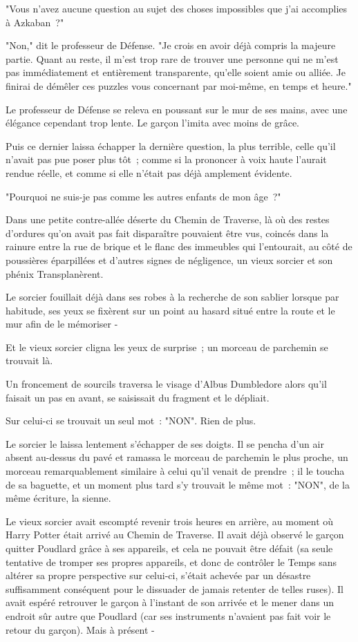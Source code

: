 "Vous n'avez aucune question au sujet des choses impossibles que j'ai accomplies à Azkaban~?"

"Non," dit le professeur de Défense. "Je crois en avoir déjà compris la majeure partie. Quant au reste, il m'est trop rare de trouver une personne qui ne m'est pas immédiatement et entièrement transparente, qu'elle soient amie ou alliée. Je finirai de démêler ces puzzles vous concernant par moi-même, en temps et heure."

Le professeur de Défense se releva en poussant sur le mur de ses mains, avec une élégance cependant trop lente. Le garçon l'imita avec moins de grâce.

Puis ce dernier laissa échapper la dernière question, la plus terrible, celle qu'il n'avait pas pue poser plus tôt~; comme si la prononcer à voix haute l'aurait rendue réelle, et comme si elle n'était pas déjà amplement évidente.

"Pourquoi ne suis-je pas comme les autres enfants de mon âge~?"

\later

Dans une petite contre-allée déserte du Chemin de Traverse, là où des restes d'ordures qu'on avait pas fait disparaître pouvaient être vus, coincés dans la rainure entre la rue de brique et le flanc des immeubles qui l'entourait, au côté de poussières éparpillées et d'autres signes de négligence, un vieux sorcier et son phénix Transplanèrent.

Le sorcier fouillait déjà dans ses robes à la recherche de son sablier lorsque par habitude, ses yeux se fixèrent sur un point au hasard situé entre la route et le mur afin de le mémoriser -

Et le vieux sorcier cligna les yeux de surprise~; un morceau de parchemin se trouvait là.

Un froncement de sourcils traversa le visage d'Albus Dumbledore alors qu'il faisait un pas en avant, se saisissait du fragment et le dépliait.

Sur celui-ci se trouvait un seul mot~: "NON". Rien de plus.

Le sorcier le laissa lentement s'échapper de ses doigts. Il se pencha d'un air absent au-dessus du pavé et ramassa le morceau de parchemin le plus proche, un morceau remarquablement similaire à celui qu'il venait de prendre~; il le toucha de sa baguette, et un moment plus tard s'y trouvait le même mot~: "NON", de la même écriture, la sienne.

Le vieux sorcier avait escompté revenir trois heures en arrière, au moment où Harry Potter était arrivé au Chemin de Traverse. Il avait déjà observé le garçon quitter Poudlard grâce à ses appareils, et cela ne pouvait être défait (sa seule tentative de tromper ses propres appareils, et donc de contrôler le Temps sans altérer sa propre perspective sur celui-ci, s'était achevée par un désastre suffisamment conséquent pour le dissuader de jamais retenter de telles ruses). Il avait espéré retrouver le garçon à l'instant de son arrivée et le mener dans un endroit sûr autre que Poudlard (car ses instruments n'avaient pas fait voir le retour du garçon). Mais à présent -

